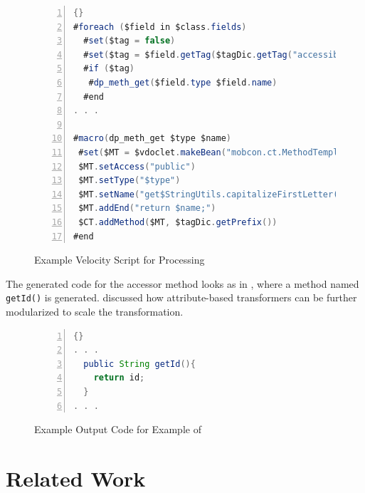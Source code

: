 \begin{figure}[ht]
	\begin{center}
	\begin{minipage}[t]{10cm}
		\begin{scriptsize}
		\begin{lstlisting}[numbers=left,language=Java,frame=leftline,showstringspaces=false]{}
#foreach ($field in $class.fields)
  #set($tag = false)
  #set($tag = $field.getTag($tagDic.getTag("accessible")))
  #if ($tag)
   #dp_meth_get($field.type $field.name)
  #end
. . .

#macro(dp_meth_get $type $name)
 #set($MT = $vdoclet.makeBean("mobcon.ct.MethodTemplate"))
 $MT.setAccess("public")
 $MT.setType("$type")
 $MT.setName("get$StringUtils.capitalizeFirstLetter($name)")
 $MT.addEnd("return $name;")
 $CT.addMethod($MT, $tagDic.getPrefix())
#end
		\end{lstlisting}
		\end{scriptsize}
		\end{minipage}
	\end{center}
	\caption{Example Velocity Script for Processing }
	\label{fig:mc.code.vs}
\end{figure}

\noindent The generated code for the accessor method looks as in , where a method named \texttt{get\-Id()} is generated.  discussed how attribute-based transformers can be further modularized to scale the transformation.

\begin{figure}[ht]
	\begin{center}
	\begin{minipage}[t]{5cm}
		\begin{scriptsize}
\begin{lstlisting}[numbers=left,language=Java,frame=leftline,showstringspaces=false]{}
. . .
  public String getId(){
    return id;
  }
. . .
		\end{lstlisting}
		\end{scriptsize}
		\end{minipage}
	\end{center}
	\caption{Example Output Code for Example of }
	\label{fig:mc.code.vs.out}
\end{figure}

\section{Related Work}
\label{sec.mc.rel}

